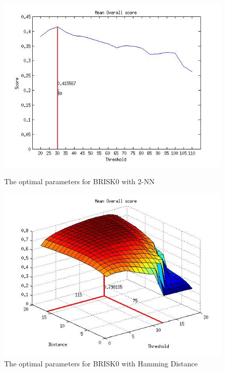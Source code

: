 \documentclass{report}
\begin{document}
\begin{figure}
\begin{minipage}[b]{0.5\linewidth}
\includegraphics[scale=0.4]{../Drawings/OptimalParameters_SBRISK_SBRISK_KNN.jpg}
\caption{The optimal parameters for BRISK0 with 2-NN}
\label{fig:BRISK0knnOptimal}
\end{minipage}
\hspace{0.5cm}
\begin{minipage}[b]{0.5\linewidth}
\includegraphics[scale=0.4]{../Drawings/OptimalParameters_SBRISK_SBRISK_hamming.jpg}
\caption{The optimal parameters for BRISK0 with Hamming Distance}
\label{fig:BRISK0hammingOptimal}
\end{minipage}

\end{figure}
\end{document}

